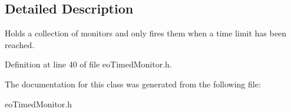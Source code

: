 \subsection{Detailed Description}
Holds a collection of monitors and only fires them when a time limit has been reached. 



Definition at line 40 of file eo\-Timed\-Monitor.h.

The documentation for this class was generated from the following file:\begin{CompactItemize}
\item 
eo\-Timed\-Monitor.h\end{CompactItemize}
